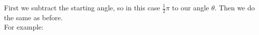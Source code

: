 \documentclass[preview]{standalone}
\begin{document}
\begin{center}
First we subtract the starting angle, so in this case $\frac{1}{2} \pi$ to our angle $\theta$. Then we do the same as before. \\ For example:
\end{center}
\end{document}

